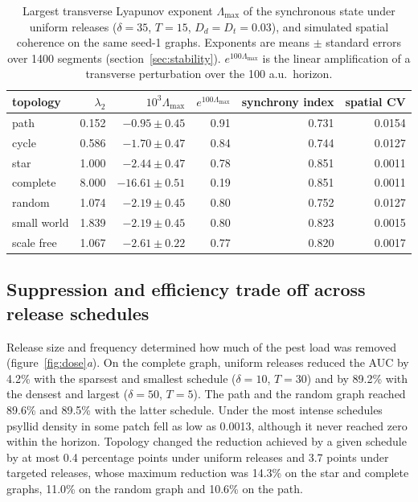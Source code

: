 \begin{table}[t]
\centering
\caption{Largest transverse Lyapunov exponent $\Lambda_{\max}$ of the synchronous state under uniform releases ($\delta=35$, $T=15$, $D_d=D_t=0.03$), and simulated spatial coherence on the same seed-1 graphs. Exponents are means $\pm$ standard errors over 1400 segments (section~\ref{sec:stability}). $e^{100\Lambda_{\max}}$ is the linear amplification of a transverse perturbation over the 100 a.u.\ horizon.}
\label{tab:stability}
\small
\begin{tabular}{lrrrrr}
\toprule
topology & $\lambda_2$ & $10^{3}\Lambda_{\max}$ & $e^{100\Lambda_{\max}}$ & synchrony index & spatial CV\\
\midrule
path        & 0.152 &  $-0.95 \pm 0.45$ & 0.91 & 0.731 & 0.0154\\
cycle       & 0.586 &  $-1.70 \pm 0.47$ & 0.84 & 0.744 & 0.0127\\
star        & 1.000 &  $-2.44 \pm 0.47$ & 0.78 & 0.851 & 0.0011\\
complete    & 8.000 & $-16.61 \pm 0.51$ & 0.19 & 0.851 & 0.0011\\
random      & 1.074 &  $-2.19 \pm 0.45$ & 0.80 & 0.752 & 0.0127\\
small world & 1.839 &  $-2.19 \pm 0.45$ & 0.80 & 0.823 & 0.0015\\
scale free  & 1.067 &  $-2.61 \pm 0.22$ & 0.77 & 0.820 & 0.0017\\
\bottomrule
\end{tabular}
\end{table}

\subsection{Suppression and efficiency trade off across release schedules}
\label{sec:res-dose}

Release size and frequency determined how much of the pest load was removed (figure~\ref{fig:dose}\emph{a}). On the complete graph, uniform releases reduced the AUC by 4.2\% with the sparsest and smallest schedule ($\delta = 10$, $T = 30$) and by 89.2\% with the densest and largest ($\delta = 50$, $T = 5$). The path and the random graph reached 89.6\% and 89.5\% with the latter schedule. Under the most intense schedules psyllid density in some patch fell as low as 0.0013, although it never reached zero within the horizon. Topology changed the reduction achieved by a given schedule by at most 0.4 percentage points under uniform releases and 3.7 points under targeted releases, whose maximum reduction was 14.3\% on the star and complete graphs, 11.0\% on the random graph and 10.6\% on the path.

